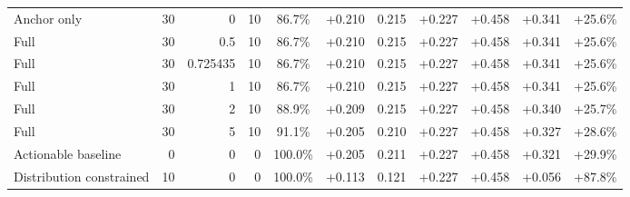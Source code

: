 \begin{table}[htbp]
\begin{tabular}{lrrrccccccc}
Anchor only & 30 & 0 & 10 & 86.7\% & +0.210 & 0.215 & +0.227 & +0.458 & +0.341 & +25.6\% \\
Full & 30 & 0.5 & 10 & 86.7\% & +0.210 & 0.215 & +0.227 & +0.458 & +0.341 & +25.6\% \\
Full & 30 & 0.725435 & 10 & 86.7\% & +0.210 & 0.215 & +0.227 & +0.458 & +0.341 & +25.6\% \\
Full & 30 & 1 & 10 & 86.7\% & +0.210 & 0.215 & +0.227 & +0.458 & +0.341 & +25.6\% \\
Full & 30 & 2 & 10 & 88.9\% & +0.209 & 0.215 & +0.227 & +0.458 & +0.340 & +25.7\% \\
Full & 30 & 5 & 10 & 91.1\% & +0.205 & 0.210 & +0.227 & +0.458 & +0.327 & +28.6\% \\
Actionable baseline & 0 & 0 & 0 & 100.0\% & +0.205 & 0.211 & +0.227 & +0.458 & +0.321 & +29.9\% \\
Distribution constrained & 10 & 0 & 0 & 100.0\% & +0.113 & 0.121 & +0.227 & +0.458 & +0.056 & +87.8\% \\
\bottomrule
\end{tabular}
\end{table}